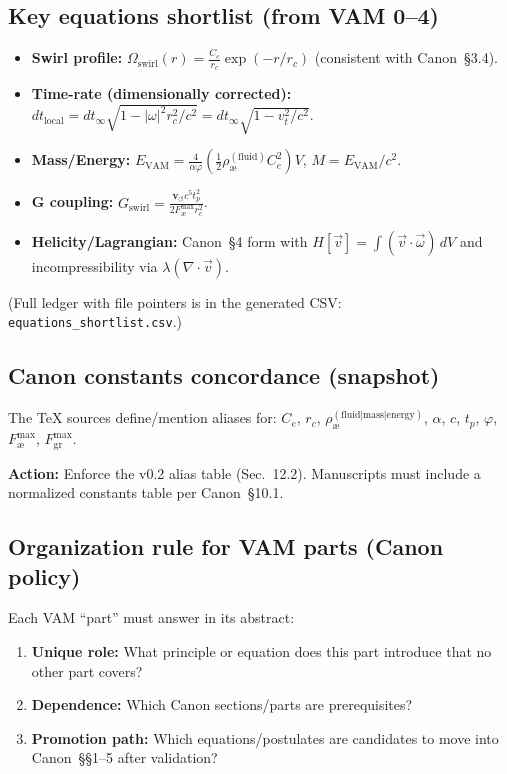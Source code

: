 \documentclass[11pt]{article}
\begin{document}
    \subsection{Key equations shortlist (from VAM 0--4)}
    \begin{itemize}
        \item \textbf{Swirl profile:} $\Omega_{\text{swirl}}(r) = \frac{C_e}{r_c} \exp(-r/r_c)$ (consistent with Canon~\S3.4).
        \item \textbf{Time-rate (dimensionally corrected):} $dt_{\text{local}} = dt_{\infty} \sqrt{1 - |\omega|^2 r_c^2 / c^2} = dt_{\infty} \sqrt{1 - v_t^2/c^2}$.
        \item \textbf{Mass/Energy:} $E_{\text{VAM}} = \frac{4}{\alpha\varphi} \left(\frac{1}{2} \rho_{\text{\ae}}^{(\text{fluid})} C_e^2\right) V$, $M = E_{\text{VAM}}/c^2$.
        \item \textbf{G coupling:} $G_{\text{swirl}} = \frac{\mathbf{v}_{\scriptscriptstyle\boldsymbol{\circlearrowleft}} c^5 t_p^2}{2 F_{\text{\ae}}^{\max} r_c^2}$.
        \item \textbf{Helicity/Lagrangian:} Canon~\S4 form with $H[\vec{v}] = \int (\vec{v} \cdot \vec{\omega})\,dV$ and incompressibility via $\lambda (\nabla\cdot\vec{v})$.
    \end{itemize}
    (Full ledger with file pointers is in the generated CSV: \texttt{equations\_shortlist.csv}.)

    \subsection{Canon constants concordance (snapshot)}
    The TeX sources define/mention aliases for: $C_e$, $r_c$, $\rho_{\text{\ae}}^{(\text{fluid|mass|energy})}$, $\alpha$, $c$, $t_p$, $\varphi$, $F_{\text{\ae}}^{\max}$, $F_{\text{gr}}^{\max}$.

    \textbf{Action:} Enforce the v0.2 alias table (Sec.~12.2). Manuscripts must include a normalized constants table per Canon~\S10.1.

    \subsection{Organization rule for VAM parts (Canon policy)}
    Each VAM ``part'' must answer in its abstract:
    \begin{enumerate}
        \item \textbf{Unique role:} What principle or equation does this part introduce that no other part covers?
        \item \textbf{Dependence:} Which Canon sections/parts are prerequisites?
        \item \textbf{Promotion path:} Which equations/postulates are candidates to move into Canon~\S\S1--5 after validation?
    \end{enumerate}
\end{document}
